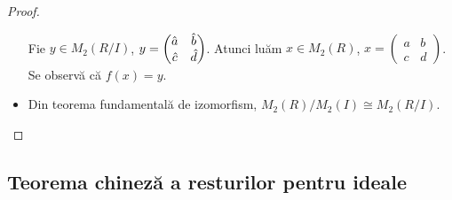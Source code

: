 \begin{proof}
\begin{itemize}
    Fie \(y \in M_2(R/I)\), \(y = \begin{pmatrix}\Hat{a} & \Hat{b} \\ \Hat{c} & \Hat{d}\end{pmatrix}\). Atunci luăm \(x \in M_2(R)\), \(x = \begin{pmatrix}a & b \\ c & d\end{pmatrix}\). Se observă că \(f(x) = y\).
    \item Din teorema fundamentală de izomorfism, \(M_2(R)/M_2(I) \cong M_2(R/I)\).
\end{itemize}
\end{proof}

\subsection{Teorema chineză a resturilor pentru ideale}

